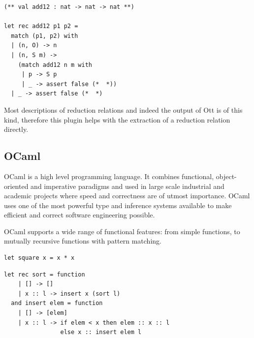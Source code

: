 \documentclass[12pt,twoside,notitlepage]{report}
\begin{document}
\begin{minipage}{\linewidth}

\begin{lstlisting}[language={Coq},caption={Coq to OCaml extraction of a logical inductive relation}, label={lst:coqlogindextractex}]
(** val add12 : nat -> nat -> nat **)

let rec add12 p1 p2 =
  match (p1, p2) with
  | (n, O) -> n
  | (n, S m) ->
    (match add12 n m with
     | p -> S p
     | _ -> assert false (*  *))
  | _ -> assert false (*  *)
\end{lstlisting}

\end{minipage}

Most descriptions of reduction relations and indeed the output of Ott is of this kind, therefore this plugin helps with the extraction of a reduction relation directly. 

\subsection{OCaml}
OCaml is a high level programming language. It combines functional, object-oriented and imperative paradigms and used in large scale industrial and academic projects where speed and correctness are of utmost importance. OCaml uses one of the most powerful type and inference systems available to make efficient and correct software engineering possible.

OCaml supports a wide range of functional features: from simple functions, to mutually recursive functions with pattern matching.
\vspace{3mm}

\begin{minipage}{\linewidth}
\begin{lstlisting}[caption={OCaml simple function example: square}]
let square x = x * x
\end{lstlisting}

\end{minipage}

\begin{minipage}{\linewidth}

\begin{lstlisting}[caption={OCaml complex function example: insertion sort}]
let rec sort = function
    | [] -> []
    | x :: l -> insert x (sort l)
  and insert elem = function
    | [] -> [elem]
    | x :: l -> if elem < x then elem :: x :: l
                else x :: insert elem l
\end{lstlisting}

\end{minipage}
\end{document}
